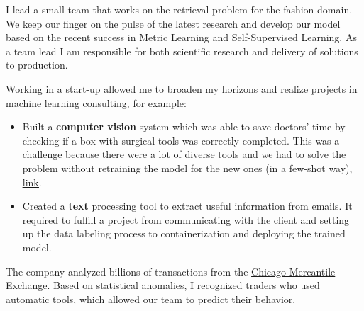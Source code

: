 
I lead a small team that works on the retrieval problem for the fashion domain.
We keep our finger on the pulse of the latest research and develop our model based on the recent success
in Metric Learning and Self-Supervised Learning.
As a team lead I am responsible for both scientific research and delivery of solutions to production.

\divider

Working in a start-up allowed me to broaden my horizons and realize projects in machine learning consulting, for example:
\begin{itemize}
\item Built a \textbf{computer vision} system which was able to save doctors' time by checking if a box with surgical tools was correctly completed. This was a challenge because there were a lot of diverse tools and we had to solve the problem without retraining the model for the new ones (in a few-shot way), \href{https://drive.google.com/file/d/1FBNRTkxkGzzfVHlrwJCauK7xjBWkI7xO/view?usp=sharing}{\underline{link}}.
\item Created a \textbf{text} processing tool to extract useful information from emails. It required to fulfill a project from communicating with the client and setting up the data labeling process to containerization and deploying the trained model.
\end{itemize}

\divider

The company analyzed billions of transactions from the \href{https://en.wikipedia.org/wiki/Chicago_Mercantile_Exchange}
{Chicago Mercantile Exchange}.
Based on statistical anomalies, I recognized traders who used automatic tools, which allowed our team to predict their behavior.
